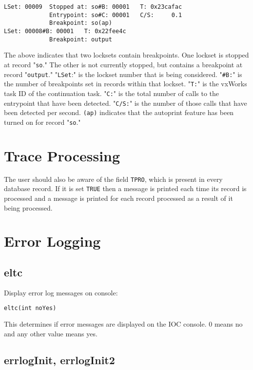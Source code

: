 \begin{verbatim}LSet: 00009  Stopped at: so#B: 00001   T: 0x23cafac
             Entrypoint: so#C: 00001   C/S:     0.1
             Breakpoint: so(ap)
LSet: 00008#B: 00001   T: 0x22fee4c
             Breakpoint: output
\end{verbatim}The above indicates that two locksets contain breakpoints. One lockset is stopped at record "\verb|so|." The other is not 
currently stopped, but contains a breakpoint at record "\verb|output|." "\verb|LSet|:" is the lockset number that is being considered. 
"\verb|#B:|" is the number of breakpoints set in records within that lockset. "\verb|T:|" is the vxWorks task ID of the continuation 
task. "\verb|C:|" is the total number of calls to the entrypoint that have been detected. "\verb|C/S:|" is the number of those calls that 
have been detected per second. \verb|(ap)| indicates that the autoprint feature has been turned on for record "\verb|so|."

\section{Trace Processing}

The user should also be aware of the field \verb|TPRO|, which is present in every database record. If it is set \verb|TRUE| then a 
message is printed each time its record is processed and a message is printed for each record processed as a result of it 
being processed.

\section{Error Logging}

\subsection{eltc}

Display error log messages on console:

\begin{verbatim}eltc(int noYes)
\end{verbatim}This determines if error messages are displayed on the IOC console. 0 means no and any other value means yes.

\subsection{errlogInit, errlogInit2}

